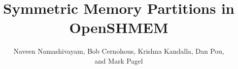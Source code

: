 \documentclass[runningheads,a4paper]{llncs}
\begin{document}
\mainmatter
\title{Symmetric Memory Partitions in OpenSHMEM}
\author{Naveen Namashivayam, Bob Cernohous, Krishna Kandalla, Dan Pou,\\
and Mark Pagel}


\maketitle
\begin{abstract}

\end{abstract}













\end{document}

